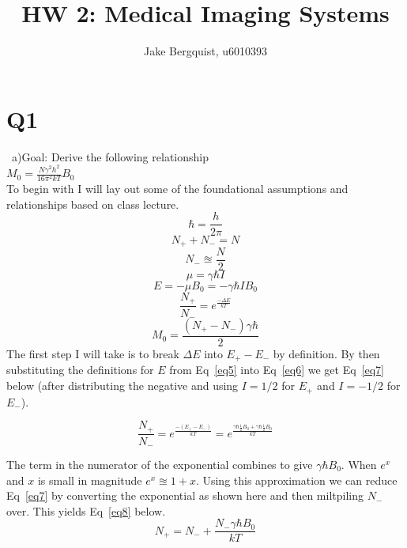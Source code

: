 \documentclass[12pt]{article}
\begin{document}
\title{HW 2: Medical Imaging Systems}
\author{Jake Bergquist, u6010393 }
\maketitle

\section{Q1}\
a)Goal: Derive the following relationship\\
$M_0 = \frac{N\gamma^2h^2}{16\pi^2kT}B_0$\\
To begin with I will lay out some of the foundational assumptions and relationships based on class lecture.\\

\begin{equation}
\hbar = \frac{h}{2\pi}
\label{eq1}
\end{equation}
\begin{equation}
N_+ + N_- = N
\label{eq2}
\end{equation}
\begin{equation}
N_- \approxeq \frac{N}{2}
\label{eq3}
\end{equation}
\begin{equation}
\mu = \gamma \hbar I
\label{eq4}
\end{equation}
\begin{equation}
E = -\mu B_0 = -\gamma \hbar I B_0
\label{eq5}
\end{equation}
\begin{equation}
\frac{N_+}{N_-} = e^{\frac{-\Delta E}{kT}}
\label{eq6}
\end{equation}
\begin{equation}
M_0 = \frac{(N_+ - N_-)\gamma \hbar}{2}
\label{eqKey}
\end{equation}
The first step I will take is to break $\Delta E$ into $E_+ - E_-$ by definition. By then substituting the definitions for $E$ from Eq~\ref{eq5} into Eq~\ref{eq6} we get Eq~\ref{eq7} below (after distributing the negative and using $I = 1/2$ for $E_+$ and $I = -1/2$ for $E_-$).

\begin{equation}
\frac{N_+}{N_-} = e^{\frac{-(E_+-E_-)}{kT}} = e^{\frac{\gamma \hbar \frac{1}{2} B_0 + \gamma \hbar \frac{1}{2} B_0}{kT}}
\label{eq7}
\end{equation}

The term in the numerator of the exponential combines to give $\gamma \hbar B_0$. When $e^x$ and $x$ is small in magnitude $e^x \approxeq 1+ x$. Using this approximation we can reduce Eq~\ref{eq7} by converting the exponential as shown here and then miltpiling $N_-$ over. This yields Eq~\ref{eq8} below.
\begin{equation}
N_+ = N_- + \frac{N_- \gamma \hbar  B_0}{kT}
\label{eq8}
\end{equation}
\end{document}
